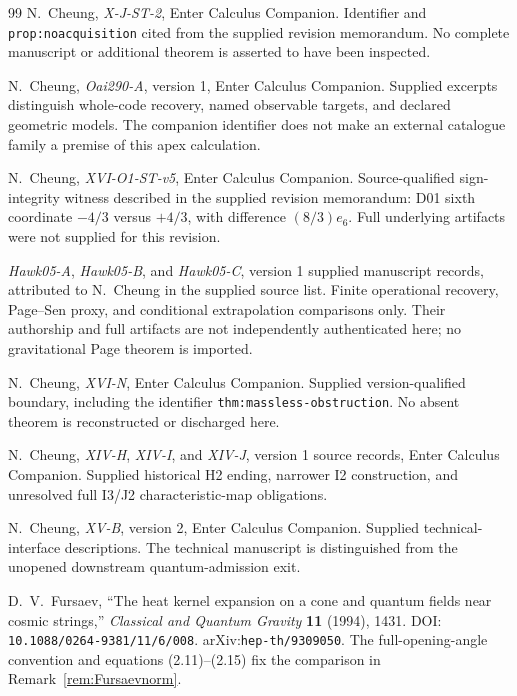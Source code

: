 \documentclass[11pt,a4paper]{article}
\newcommand{\loc}[1]{\nolinkurl{#1}}
\theoremstyle{plain}
\theoremstyle{definition}
\theoremstyle{remark}
\numberwithin{equation}{section}
\begin{document}
\begin{thebibliography}{99}
\ddag N.~Cheung,
\emph{X-J-ST-2},
Enter Calculus Companion.
Identifier and \loc{prop:noacquisition} cited from the supplied
revision memorandum. No complete manuscript or additional
theorem is asserted to have been inspected.

\ddag N.~Cheung,
\emph{Oai290-A},
version 1, Enter Calculus Companion.
Supplied excerpts distinguish whole-code recovery, named
observable targets, and declared geometric models.
The companion identifier does not make an external catalogue
family a premise of this apex calculation.

\ddag N.~Cheung,
\emph{XVI-O1-ST-v5},
Enter Calculus Companion.
Source-qualified sign-integrity witness described in the
supplied revision memorandum:
D01 sixth coordinate \(-4/3\) versus \(+4/3\), with
difference \((8/3)e_6\).
Full underlying artifacts were not supplied for this revision.

\ddag \emph{Hawk05-A}, \emph{Hawk05-B}, and \emph{Hawk05-C},
version 1 supplied manuscript records,
attributed to N.~Cheung in the supplied source list.
Finite operational recovery, Page--Sen proxy, and conditional
extrapolation comparisons only.
Their authorship and full artifacts are not independently
authenticated here; no gravitational Page theorem is imported.

\ddag N.~Cheung,
\emph{XVI-N},
Enter Calculus Companion.
Supplied version-qualified boundary, including the identifier
\loc{thm:massless-obstruction}.
No absent theorem is reconstructed or discharged here.

\ddag N.~Cheung,
\emph{XIV-H}, \emph{XIV-I}, and \emph{XIV-J},
version 1 source records, Enter Calculus Companion.
Supplied historical H2 ending, narrower I2 construction, and
unresolved full I3/J2 characteristic-map obligations.

\ddag N.~Cheung,
\emph{XV-B},
version 2, Enter Calculus Companion.
Supplied technical-interface descriptions.
The technical manuscript is distinguished from the unopened
downstream quantum-admission exit.

\dag D.~V.~Fursaev,
``The heat kernel expansion on a cone and quantum fields near
cosmic strings,''
\emph{Classical and Quantum Gravity} \textbf{11} (1994), 1431.
DOI: \nolinkurl{10.1088/0264-9381/11/6/008}.
arXiv:\nolinkurl{hep-th/9309050}.
The full-opening-angle convention and equations (2.11)--(2.15)
fix the comparison in Remark~\ref{rem:Fursaevnorm}.


\end{thebibliography}
\end{document}
